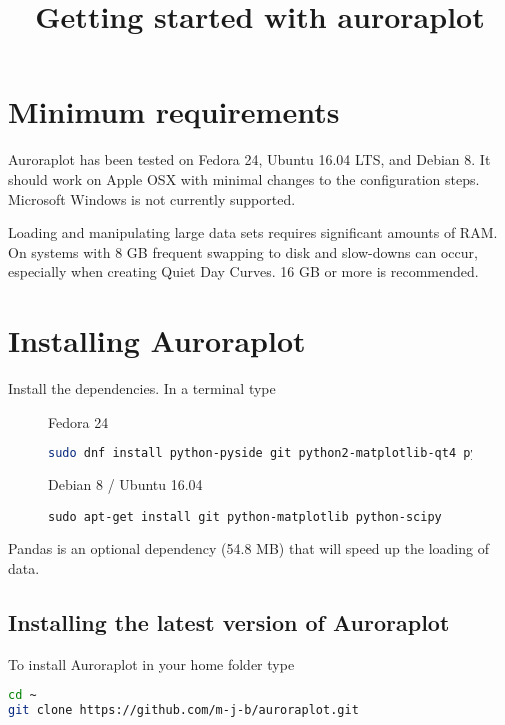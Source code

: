 \documentclass{article}
\begin{document}
\title{Getting started with auroraplot}
\date{}
\maketitle

\section{Minimum requirements}
Auroraplot has been tested on Fedora 24, Ubuntu 16.04 LTS, and Debian 8.
It should work on Apple OSX with minimal changes to the configuration steps.
Microsoft Windows is not currently supported.

Loading and manipulating large data sets requires significant amounts of RAM.
On systems with 8 GB frequent swapping to disk and slow-downs can occur,
especially when creating Quiet Day Curves. 16 GB or more is recommended.

\section{Installing Auroraplot}

Install the dependencies. In a terminal type

\begin{figure}[htb!]
\begin{minipage}[b]{0.45\linewidth}
Fedora 24
\begin{lstlisting}[language=Bash]
sudo dnf install python-pyside git python2-matplotlib-qt4 python-requests ipython python-scipy python-pandas
\end{lstlisting}
\end{minipage}
\hspace{0.5cm}
\begin{minipage}[b]{0.45\linewidth}
Debian 8 / Ubuntu 16.04
\begin{lstlisting}                 
sudo apt-get install git python-matplotlib python-scipy 
\end{lstlisting}
\end{minipage} 
\end{figure}

Pandas is an optional dependency (54.8 MB) that will speed up the loading of data.

\subsection{Installing the latest version of Auroraplot}
To install Auroraplot in your home folder type
\begin{lstlisting}[language=Bash]
cd ~
git clone https://github.com/m-j-b/auroraplot.git
\end{lstlisting}
\end{document}

